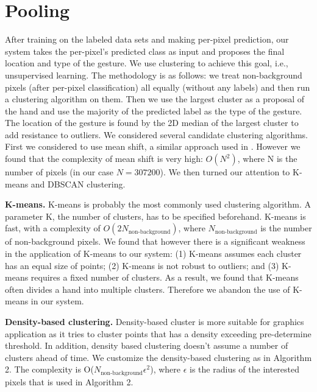 \section{Pooling}
\label{sec: pooling}

After training on the labeled data sets and making per-pixel prediction, our system takes the per-pixel's predicted class as input and proposes the final location and type of the gesture. We use clustering to achieve this goal, i.e., unsupervised learning. The methodology is as follows: we treat non-background pixels (after per-pixel classification) all equally (without any labels) and then run a clustering algorithm on them. Then we use the largest cluster as a proposal of the hand and use the majority of the predicted label as the type of the gesture. The location of the gesture is found by the 2D median of the largest cluster to add resistance to outliers. We considered several candidate clustering algorithms. First we considered to use mean shift, a similar approach used in \cite{shotton2011}. However we found that the complexity of mean shift is very high: $O(N^2)$, where N is the number of pixels (in our case $N= 307200$). We then turned our attention to K-means and DBSCAN clustering.

\textbf{K-means.} K-means is probably the most commonly used clustering algorithm. A parameter K, the number of clusters, has to be specified beforehand. K-means is fast, with a complexity of $O(2N_{\text{non-background}})$, where $N_{\text{non-background}}$ is the number of non-background pixels. We found that however there is a significant weakness in the application of K-means to our system: (1) K-means assumes each cluster has an equal size of points; (2) K-means is not robust to outliers; and (3) K-means requires a fixed number of clusters. As a result, we found that K-means often divides a hand into multiple clusters. Therefore we abandon the use of K-means in our system.

\textbf{Density-based clustering.} Density-based cluster is more suitable for graphics application as it tries to cluster points that has a density exceeding pre-determine threshold. In addition, density based clustering doesn't assume a number of clusters ahead of time. We customize the density-based clustering as in Algorithm 2. The complexity is O($N_{\text{non-background} }\epsilon^2$), where $\epsilon$ is the radius of the interested pixels that is used in Algorithm 2.

